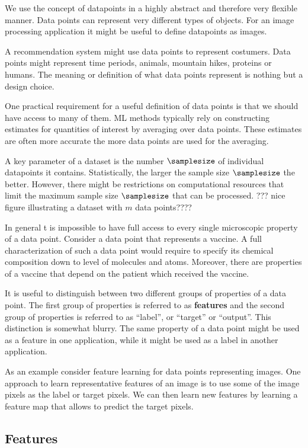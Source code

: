 \documentclass[12pt]{report}
\begin{document}
We use the concept of datapoints in a highly abstract and 
therefore very flexible manner. Data points can represent 
very different types of objects. For an image processing 
application it might be useful to define datapoints as images. 

A recommendation system might use data points to represent 
costumers.  Data points might represent time periods, animals, 
mountain hikes, proteins or humans. The meaning or definition 
of what data points represent is nothing but a design choice. 
 
One practical requirement for a useful definition of data points is 
that we should have access to many of them. ML methods typically 
rely on constructing estimates for quantities of interest by averaging 
over data points. These estimates are often more accurate the more 
data points are used for the averaging. 

A key parameter of a dataset is the number $\samplesize$ of individual 
datapoints it contains. Statistically, the larger the sample size $\samplesize$ 
the better. However, there might be restrictions on computational 
resources that limit the maximum sample size $\samplesize$ that can be 
processed. ??? nice figure illustrating a dataset with $m$ data points????

In general t is impossible to have full access to every single 
microscopic property of a data point. Consider a data point 
that represents a vaccine. A full characterization of such a 
data point would require to specify its chemical composition 
down to level of molecules and atoms. Moreover, there are 
properties of a vaccine that depend on the patient which 
received the vaccine. 

It is useful to distinguish between two different groups of 
properties of a data point. The first group of properties is 
referred to as {\bf features}  and the second group of properties 
is referred to as ``label'', or ``target'' or ``output''. This 
distinction is somewhat blurry. The same property of a 
data point might be used as a feature in one application, 
while it might be used as a label in another application. 

As an example consider feature learning for data points 
representing images. One approach to learn representative 
features of an image is to use some of the image pixels as 
the label or target pixels. We can then learn new features 
by learning  a feature map that allows to predict the target 
pixels. 

\subsection{Features}
\label{sec_feature_space}
\end{document}
